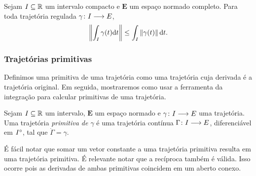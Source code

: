 \begin{exercise}
Sejam $I \subseteq \mathbb{R}$ um intervalo compacto e $\bm E$ um espaço normado completo. Para toda trajetória regulada $\gamma\colon \allowbreak I \longrightarrow E$,
	\begin{equation*}
	\left\Vert{\int_I \gamma(t) \mathrm{d}t}\right\Vert \leq \int_I \left\Vert{\gamma(t)}\right\Vert \mathrm{d} t.
	\end{equation*}
\end{exercise}

\subsubsection{Trajetórias primitivas}

Definimos uma primitiva de uma trajetória como uma trajetória cuja derivada é a trajetória original. Em seguida, mostraremos como usar a ferramenta da integração para calcular primitivas de uma trajetória.

\begin{definition}
Sejam $I \subseteq \mathbb{R}$ um intervalo, $\bm E$ um espaço normado e $\gamma\colon \allowbreak I \longrightarrow E$ uma trajetória. Uma trajetória \emph{primitiva de $\gamma$} é uma trajetória contínua $\Gamma\colon \allowbreak I \longrightarrow E$, diferenciável em ${I}^\circ$, tal que $\dot \Gamma = \gamma$.
\end{definition}

É fácil notar que somar um vetor constante a uma trajetória primitiva resulta em uma trajetória primitiva. É relevante notar que a recíproca também é válida. Isso ocorre pois as derivadas de ambas primitivas coincidem em um aberto conexo.

